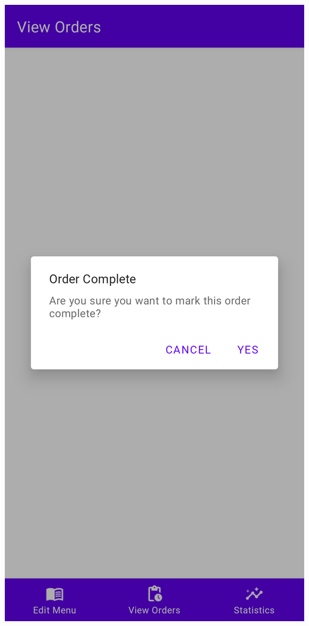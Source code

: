 \documentclass{article}
\begin{document}
\begin{center}
\includegraphics[scale=0.15]{complete-order}
\end{center}
\end{document}
